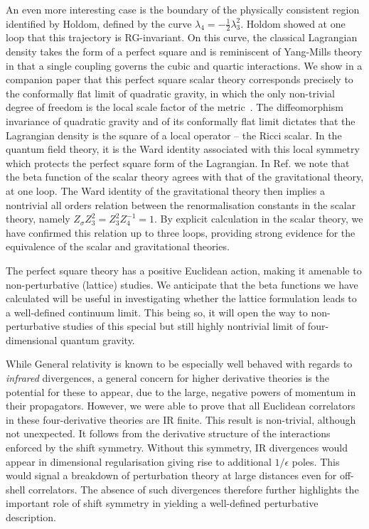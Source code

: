 \documentclass[a4paper,11pt]{article}
\begin{document}
An even more interesting case is the boundary of the physically consistent region identified by Holdom, defined by the curve $\lambda_4=-\frac{1}{2} \lambda_3^2$. Holdom showed at one loop that this trajectory is RG-invariant. On this curve, the classical Lagrangian density takes the form of a perfect square and is reminiscent of Yang-Mills theory in that a single coupling governs the cubic and quartic interactions. We show in a companion paper that this perfect square scalar theory corresponds precisely to the conformally flat limit of quadratic gravity, in which the only non-trivial degree of freedom is the local scale factor of the metric~\cite{Anderson:2026Rsqaured}. The diffeomorphism invariance of quadratic gravity and of its conformally flat limit dictates that the Lagrangian density is the square of a local operator -- the Ricci scalar. In the quantum field theory, it is the Ward identity associated with this local symmetry which protects the perfect square form of the Lagrangian. In Ref.\cite{Anderson:2026Rsqaured} we note that the beta function of the scalar theory agrees with that of the gravitational theory, at one loop. The Ward identity of the gravitational theory then implies a nontrivial all orders relation between the renormalisation constants in the scalar theory, namely $Z_\sigma Z_3^2=  Z_3^2Z_4^{-1} =1$. By explicit calculation in the scalar theory, we have confirmed this relation up to three loops, providing strong evidence for the equivalence of the scalar and gravitational theories. 

The perfect square theory has a positive Euclidean action, making it amenable to non-perturbative (lattice) studies. We anticipate that the beta functions we have calculated will be useful in investigating whether the lattice formulation leads to a well-defined continuum limit. This being so, it will open the way to non-perturbative studies of this special but still highly nontrivial limit of four-dimensional quantum gravity. 

While General relativity is known to be especially well behaved with regards to {\it infrared} divergences, a general concern for higher derivative theories is the potential for these to appear, due to the large, negative powers of momentum in their propagators. However, we were able to prove that all Euclidean correlators in these four-derivative theories are IR finite. This result is non-trivial, although not unexpected. It follows from the derivative structure of the interactions enforced by the shift symmetry. Without this symmetry, IR divergences would appear in dimensional regularisation giving rise to additional $1/\epsilon$ poles. This would signal a breakdown of perturbation theory at large distances even for off-shell correlators. The absence of such divergences therefore further highlights the important role of shift symmetry in yielding a well-defined perturbative description. 
\end{document}
